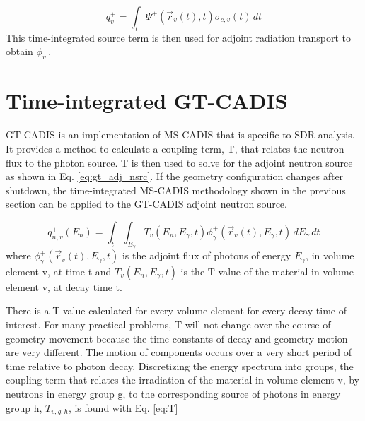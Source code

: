  \begin{equation}\label{eq:adj_src_1_avg}
	 q_{v}^{+} =
	 \int_{t}  \Psi^{+}(\overrightarrow{r}_{v}(t), t)
	 \sigma_{c,v}(t)\, dt
 \end{equation}
This time-integrated source term is then used
for adjoint radiation transport to obtain $\phi_{v}^{+}$.

\section{Time-integrated GT-CADIS}
GT-CADIS is an implementation of MS-CADIS that is specific to SDR analysis.  It
provides a method to calculate a coupling term, T, that relates the neutron
flux to the photon source.
T is then used to solve for the adjoint neutron source as shown in Eq.
\ref{eq:gt_adj_nsrc}.
If the geometry configuration changes after shutdown, the time-integrated
MS-CADIS methodology shown in the previous section can be applied to the
GT-CADIS adjoint neutron source.

 \begin{equation}\label{eq:adj_src_1_avg}
	 q_{n,v}^{+}(E_{n}) =
	 \int_{t}  \int_{E_{\gamma}}
	 T_{v}(E_n, E_{\gamma}, t) 
	 \phi_{\gamma}^{+}(\overrightarrow{r}_{v}(t), E_{\gamma},t)
	 \, dE_{\gamma} \, dt
 \end{equation}
where $\phi_{\gamma}^{+}(\overrightarrow{r}_{v}(t), E_{\gamma},t) $ is the 
adjoint flux of photons of energy $E_{\gamma}$, in volume element v, at time t
and $T_{v}(E_n, E_{\gamma}, t) $ is the T value of the material in volume
element v, at decay time t.

There is a T value calculated for every volume element for every decay time of
interest.  For many practical problems, T will not change over the course of
geometry movement  because the time constants of decay and geometry
motion are very different.  The motion of components occurs over a very short
period of time relative to photon decay.  
Discretizing the energy spectrum into groups, the coupling term that relates 
the irradiation of the material in volume
element v, by neutrons in energy group g, to the corresponding source of
photons in energy group h, $T_{v,g,h}$, is found with Eq.
\ref{eq:T}

